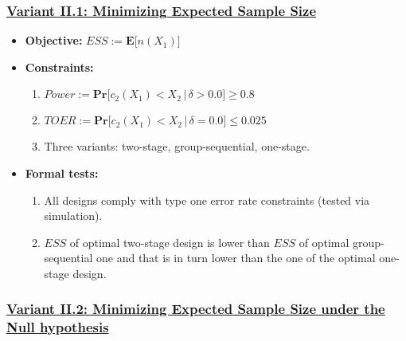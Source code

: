 \documentclass[]{book}
\providecommand{\tightlist}{%
  \setlength{\itemsep}{0pt}\setlength{\parskip}{0pt}}
\begin{document}
\hypertarget{variant-ii.1-minimizing-expected-sample-size}{%
\subsubsection{\texorpdfstring{\protect\hyperlink{variantII_1}{Variant II.1: Minimizing Expected Sample Size}}{Variant II.1: Minimizing Expected Sample Size}}\label{variant-ii.1-minimizing-expected-sample-size}}

\begin{itemize}
\tightlist
\item
  \textbf{Objective:} \(ESS := \boldsymbol{E}\big[n(X_1)\big]\)
\item
  \textbf{Constraints:}

  \begin{enumerate}
  \def\labelenumi{\arabic{enumi}.}
  \tightlist
  \item
    \(Power := \boldsymbol{Pr}\big[c_2(X_1) < X_2\,|\,\delta> 0.0\big] \geq 0.8\)
  \item
    \(TOER := \boldsymbol{Pr}\big[c_2(X_1) < X_2\,|\,\delta=0.0\big] \leq 0.025\)
  \item
    Three variants: two-stage, group-sequential, one-stage.
  \end{enumerate}
\item
  \textbf{Formal tests:}

  \begin{enumerate}
  \def\labelenumi{\arabic{enumi}.}
  \tightlist
  \item
    All designs comply with type one error rate constraints (tested via
    simulation).
  \item
    \(ESS\) of optimal two-stage design is lower than \(ESS\) of optimal
    group-sequential one and that is in turn lower than the one of the
    optimal one-stage design.
  \end{enumerate}
\end{itemize}

\hypertarget{variant-ii.2-minimizing-expected-sample-size-under-the-null-hypothesis}{%
\subsubsection{\texorpdfstring{\protect\hyperlink{variantII_2}{Variant II.2: Minimizing Expected Sample Size under the Null hypothesis}}{Variant II.2: Minimizing Expected Sample Size under the Null hypothesis}}\label{variant-ii.2-minimizing-expected-sample-size-under-the-null-hypothesis}}
\end{document}
